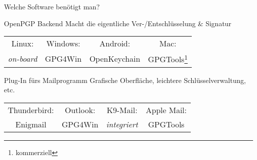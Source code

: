\begin{frame}{Welche Software benötigt man?}
  \begin{block}{OpenPGP Backend}
    Macht die eigentliche Ver-/Entschlüsselung \& Signatur

    \vspace{1ex}
    \begin{tabular}{cccc}
      Linux:            & Windows: & Android:     & Mac:\\
      \textit{on-board} & GPG4Win  & OpenKeychain & GPGTools\footnote{kommerziell}\\
    \end{tabular}
  \end{block}
  \begin{block}{Plug-In fürs Mailprogramm}
    Grafische Oberfläche, leichtere Schlüsselverwaltung, etc.

    \vspace{1ex}
    \begin{tabular}{cccc}
      Thunderbird: & Outlook: & K9-Mail:            & Apple Mail:\\
      Enigmail     & GPG4Win  & \textit{integriert} & GPGTools\\
    \end{tabular}
  \end{block}
\end{frame}

\endinput

